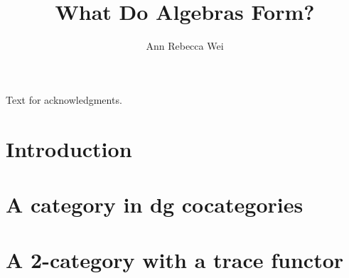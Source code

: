 \documentclass[12pt]{nuthesis} %
\author{Ann Rebecca Wei}
\title{What Do Algebras Form?}
\theoremstyle{definition}
\theoremstyle{remark}
\theoremstyle{example}
\begin{document}

\frontmatter		%
\maketitle		%

\abstract		%


\acknowledgements	%
Text for acknowledgments.




\nomenclature %


%
%
\clearpage{} %
\tableofcontents	%





\mainmatter             %

\chapter{Introduction}
	

\chapter{A category in dg cocategories} \label{chap:cat_in_dgcocats}
	
	
	

\chapter{A 2-category with a trace functor} \label{chap:2cat_trace}
	
	
	
\end{document}
